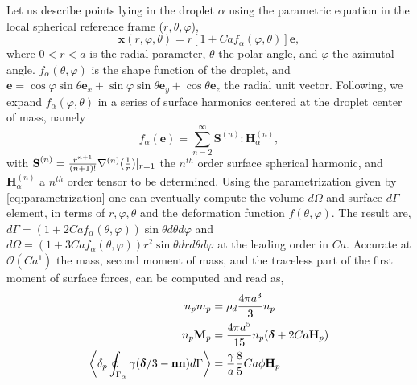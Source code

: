 Let us describe points lying in the droplet $\alpha$ using the parametric equation in the local spherical reference frame ($r,\theta,\varphi$),
\begin{equation}
    \textbf{x}(r,\varphi,\theta) = r [1+ Ca f_\alpha(\varphi,\theta)] \textbf{e},
    \label{eq:parametrization}
\end{equation}
where $0<r<a$ is the radial parameter, $\theta$ the polar angle, and $\varphi$ the azimutal angle. 
$f_\alpha(\theta,\varphi)$ is the shape function of the droplet, and $\textbf{e} = \cos\varphi\sin\theta \textbf{e}_x + \sin\varphi\sin\theta\textbf{e}_y+ \cos\theta \textbf{e}_z$ the radial unit vector. 
Following, \citet{nadim1996concise,nadim1991motion} we expand $f_\alpha(\varphi,\theta)$ in a series of surface harmonics centered at the droplet center of mass, namely 
\begin{equation}
    f_\alpha(\textbf{e}) = 
    \sum_{n=2}^\infty\textbf{S}^{(n)}:\textbf{H}_\alpha^{(n)},
    \label{eq:f_definition}
\end{equation} 
with $\textbf{S}^{(n)} = \frac{r^{n+1}}{(n+1)!}\mathbf{\nabla}^{(n)}(\frac{1}{r})|_{r=1}$ the $n^{th}$ order surface spherical harmonic, and $\textbf{H}_\alpha^{(n)}$ a $n^{th}$ order tensor to be determined\citep{nadim1991motion}. 
Using the parametrization given by \ref{eq:parametrization} one can eventually compute the volume $d\Omega$ and surface $d\Gamma$ element, in terms of $r,\varphi,\theta$ and the deformation function $f(\theta,\varphi)$.
The result are, $d\Gamma = (1+2Ca f_\alpha(\theta,\varphi)) \sin\theta d\theta d\varphi$ and $d\Omega = (1+3Ca f_\alpha(\theta,\varphi)) r^2\sin\theta drd\theta d\varphi$ at the leading order in $Ca$. 
Accurate at $\mathcal{O}(Ca^1)$ the mass, second moment of mass, and the traceless part of the first moment of surface forces, can be computed and read as,
\begin{align}
    n_p m_p &= \rho_d \frac{4\pi a^3}{3}n_p  
    \label{eq:volume}
    \\ 
    \label{eq:second_moment_of_mass}
    n_p \textbf{M}_p &= \frac{4\pi a^5}{15}n_p(\bm\delta+2Ca \textbf{H}_p) \\
    \pSavg{\gamma (\bm\delta/3 - \textbf{nn})} &=\frac{\gamma}{a}\frac{8}{5} Ca \phi \textbf{H}_p
    \label{eq:closure_surface_tension}
\end{align}
